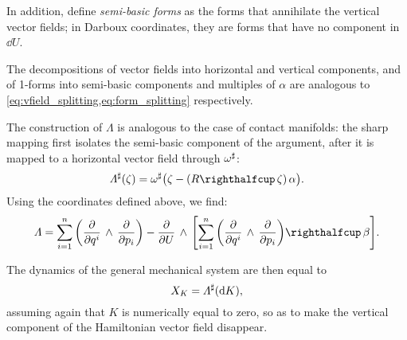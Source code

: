 In addition, define \emph{semi-basic forms} as the forms that annihilate the vertical vector fields; in Darboux coordinates, they are forms that have no component in \(\dd{U}\).

The decompositions of vector fields into horizontal and vertical components, and of 1-forms into semi-basic components and multiples of \(\alpha\) are analogous to \cref{eq:vfield_splitting,eq:form_splitting} respectively.

The construction of \(\Lambda\) is analogous to the case of contact manifolds: the sharp mapping first isolates the semi-basic component of the argument, after it is mapped to a horizontal vector field through \(\omega^\sharp\):
\begin{equation}
     \fromDual{\Lambda}(\zeta) = \fromDual{\omega}\big(\zeta - (\intpr{R}{\zeta})\,\alpha\big).
\end{equation}
Using the coordinates defined above, we find:
\begin{equation}
    \Lambda = \sum_{i=1}^n \qty(\wedgep{\pdv{}{q^i}}{\pdv{}{p_i}}) - \wedgep{\pdv{}{U}}{\qty[\intpr{\sum_{i=1}^n \qty(\wedgep{\pdv{}{q^i}}{\pdv{}{p_i}})}{\beta}]}.
    \label{eq:general_bivector}
\end{equation}

The dynamics of the general mechanical system are then equal to 
\begin{equation} 
    X_K = \Lambda^\sharp(\dd{K}), 
    \label{eq:general_isomorphism}
\end{equation}
assuming again that \(K\) is numerically equal to zero, so as to make the vertical component of the Hamiltonian vector field disappear. 

